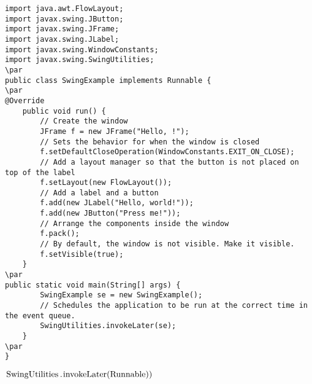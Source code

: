 \documentclass{book}
\def\lthtmlcheckvsize{\ifdim\ht\sizebox<\vsize 
  \ifdim\wd\sizebox<\hsize\expandafter\hfill\fi \expandafter\vfill
  \else\expandafter\vss\fi}%
\begin{document}
{\newpage\clearpage
{}%
\begin{lstlisting}
import java.awt.FlowLayout;
import javax.swing.JButton;
import javax.swing.JFrame;
import javax.swing.JLabel;
import javax.swing.WindowConstants;
import javax.swing.SwingUtilities;
\par
public class SwingExample implements Runnable {
\par
@Override
    public void run() {
        // Create the window
        JFrame f = new JFrame("Hello, !");
        // Sets the behavior for when the window is closed
        f.setDefaultCloseOperation(WindowConstants.EXIT_ON_CLOSE);
        // Add a layout manager so that the button is not placed on top of the label
        f.setLayout(new FlowLayout());
        // Add a label and a button
        f.add(new JLabel("Hello, world!"));
        f.add(new JButton("Press me!"));
        // Arrange the components inside the window
        f.pack();
        // By default, the window is not visible. Make it visible.
        f.setVisible(true);
    }
\par
public static void main(String[] args) {
        SwingExample se = new SwingExample();
        // Schedules the application to be run at the correct time in the event queue.
        SwingUtilities.invokeLater(se);
    }
\par
}
\end{lstlisting}%
\lthtmlfigureZ
\lthtmlcheckvsize\clearpage}

{\newpage\clearpage
{}%
$\lstinline{SwingUtilities.invokeLater(Runnable))}$%
\lthtmlindisplaymathZ
\lthtmlcheckvsize\clearpage}
\end{document}
